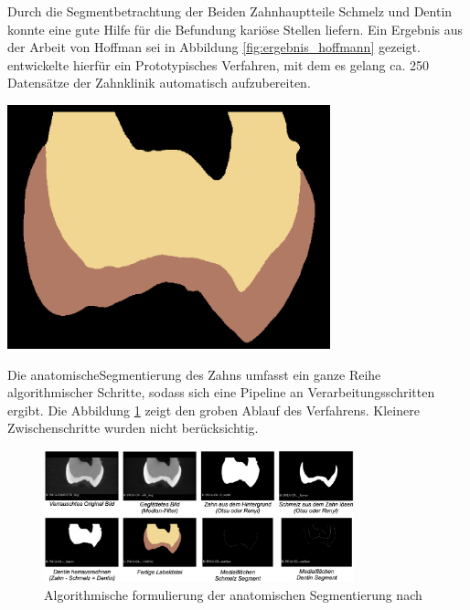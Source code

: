 \begin{minipage}{0.45\textwidth}
	Durch die Segmentbetrachtung der Beiden Zahnhauptteile Schmelz und Dentin konnte
	\citet{hoffmann2020} eine gute Hilfe für die Befundung kariöse Stellen liefern.
	Ein Ergebnis aus der Arbeit von Hoffman sei in Abbildung \ref{fig:ergebnis_hoffmann}
	gezeigt. \citet{hoffmann2020} entwickelte hierfür ein Prototypisches Verfahren,
	mit dem es gelang ca. 250 Datensätze der Zahnklinik automatisch aufzubereiten.
\end{minipage}
\hfill
\begin{minipage}{0.45\textwidth}
	\centering
	\includegraphics[width=0.7\textwidth]{img/ergebnis_hoffmann_2.jpg}
	\label{fig:ergebnis_hoffmann}
\end{minipage}

Die anatomischeSegmentierung des Zahns umfasst ein ganze Reihe algorithmischer Schritte,
sodass sich eine Pipeline an Verarbeitungsschritten ergibt. Die Abbildung \ref{fig:anatomische_segmentierung}
zeigt den groben Ablauf des Verfahrens. Kleinere Zwischenschritte wurden nicht
berücksichtig.

\begin{figure}[h]
	\centering
	\includegraphics[width=0.8\textwidth]{img/anatomischeSegmentierung.png}
	\caption{Algorithmische formulierung der anatomischen Segmentierung nach
	\citet{hoffmann2020}}
	\label{fig:anatomische_segmentierung}
\end{figure}

